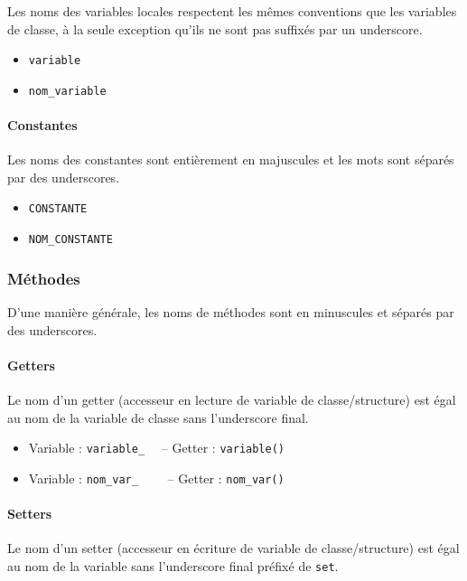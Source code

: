 \documentclass[]{report}
\begin{document}
Les noms des variables locales respectent les mêmes conventions 
que les variables de classe, à la seule exception qu'ils ne sont pas
suffixés par un underscore.

\begin{itemize}
	\item \texttt{variable}
	\item \texttt{nom\_variable}
\end{itemize}

\paragraph{Constantes}

Les noms des constantes sont entièrement en majuscules et les mots sont
séparés par des underscores.

\begin{itemize}
	\item \texttt{CONSTANTE}
	\item \texttt{NOM\_CONSTANTE}
\end{itemize}

\subsubsection{Méthodes}

D'une manière générale, les noms de méthodes sont en minuscules et
séparés par des underscores.

\paragraph{Getters}

Le nom d'un getter (accesseur en lecture de variable de classe/structure)
est égal au nom de la variable de classe sans l'underscore final.

\begin{itemize}
	\item Variable : \texttt{variable\_} ~~-- Getter : \texttt{variable()}
	\item Variable : \texttt{nom\_var\_} ~~~~-- Getter : \texttt{nom\_var()}
\end{itemize}

\paragraph{Setters}

Le nom d'un setter (accesseur en écriture de variable de classe/structure)
est égal au nom de la variable sans l'underscore final préfixé de \texttt{set}.
\end{document}
